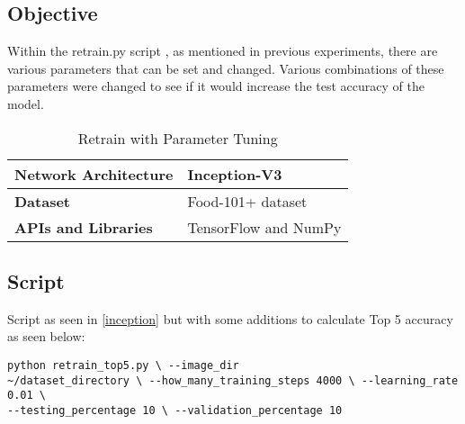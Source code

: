 \subsection*{Objective}
Within the retrain.py script \parencite{retrainInception}, as mentioned in
previous experiments, there are various parameters that can be set and changed.
Various combinations of these parameters were changed to see if it would increase the
test accuracy of the model.

\begin{table}[h]
\centering
\caption{Retrain with Parameter Tuning}
\label{my-label}
\begin{tabular}{|l|p{9cm}|}
\hline
\textbf{Network Architecture} & Inception-V3           \\ \hline
\textbf{Dataset}              & Food-101+ dataset \\ \hline
\textbf{APIs and Libraries}   & TensorFlow and NumPy                                                       \\ \hline
\end{tabular}
\end{table}

\subsection*{Script}
Script as seen in \ref{inception} but with some additions to calculate Top 5 accuracy as seen
below:

\begin{lstlisting}
python retrain_top5.py \ --image_dir
~/dataset_directory \ --how_many_training_steps 4000 \ --learning_rate 0.01 \
--testing_percentage 10 \ --validation_percentage 10
\end{lstlisting}

